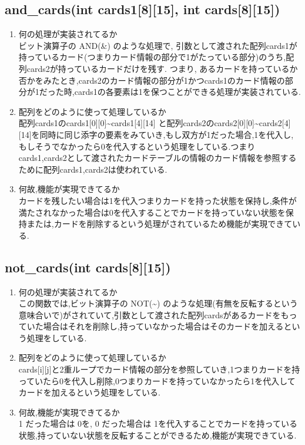 \documentclass{jsarticle}
\begin{document}
\subsection{and\_cards(int cards1[8][15], int cards[8][15])}
\begin{enumerate}
  \item  何の処理が実装されてるか\\
  ビット演算子の AND(\&) のような処理で, 引数として渡された配列cards1が持っているカード(つまりカード情報の部分で1がたっている部分)のうち,配列cards2が持っているカードだけを残す. つまり, あるカードを持っているか否かをみたとき,cards2のカード情報の部分が1かつcards1のカード情報の部分が1だった時,cards1の各要素は1を保つことができる処理が実装されている.
  \item  配列をどのように使って処理しているか\\
  配列cards1のcards1[0][0]\textasciitilde  cards1[4][14] と配列cards2のcards2[0][0]\textasciitilde  cards2[4][14]を同時に同じ添字の要素をみていき,もし双方が1だった場合,1を代入し,もしそうでなかったら0を代入するという処理をしている.つまりcards1,cards2として渡されたカードテーブルの情報のカード情報を参照するために配列cards1,cards2は使われている.
  \item  何故,機能が実現できてるか\\
  カードを残したい場合は1を代入つまりカードを持った状態を保持し,条件が満たされなかった場合は0を代入することでカードを持っていない状態を保持または,カードを削除するという処理がされているため機能が実現できている.

\end{enumerate}

\subsection{not\_cards(int cards[8][15])}
\begin{enumerate}
  \item  何の処理が実装されてるか\\
  この関数では,ビット演算子の NOT(\textasciitilde  ) のような処理(有無を反転するという意味合いで)がされていて,引数として渡された配列cardsがあるカードをもっていた場合はそれを削除し,持っていなかった場合はそのカードを加えるという処理をしている.
  \item  配列をどのように使って処理しているか\\
  cards[i][j]と2重ループでカード情報の部分を参照していき,1つまりカードを持っていたら0を代入し削除,0つまりカードを持っていなかったら1を代入してカードを加えるという処理をしている.
  \item  何故,機能が実現できてるか\\
  1 だった場合は 0を, 0 だった場合は 1を代入することでカードを持っている状態,持っていない状態を反転することができるため,機能が実現できている.

\end{enumerate}
\end{document}
